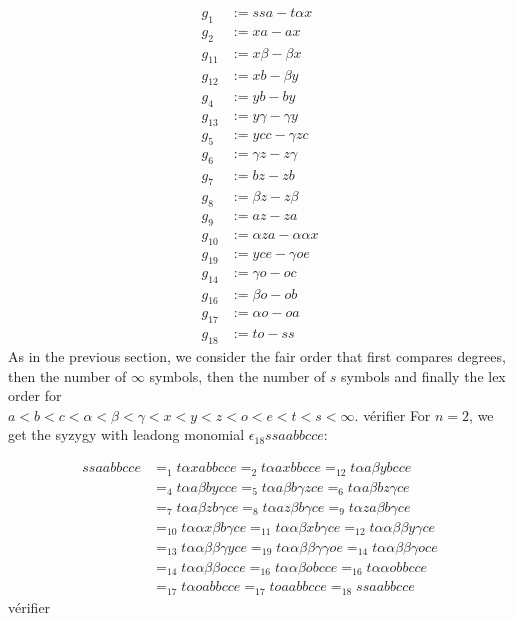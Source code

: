 \documentclass[sigconf]{acmart}
\theoremstyle{plain}
\theoremstyle{definition}
\theoremstyle{remark}
\newcommand\fixmecc[1]{{\color{red}{\underline{\bf C:}} #1}}
\begin{document}
\begin{align*}
g_1 & := ssa - t\alpha x \\ 
g_2 & := xa - ax \\ 
g_{11} & := x\beta-\beta x\\ 
g_{12} & := xb-\beta y \\ 
g_4 & := yb-by\\ 
g_{13} & := y\gamma-\gamma y \\
g_5 & := ycc-\gamma zc \\ 
g_6 & :=  \gamma z-z\gamma\\ 
g_7 & := bz-zb \\
g_8 & := \beta z-z\beta \\
g_9 & := az-za \\ 
g_{10} & := \alpha za-\alpha\alpha x  \\ 
g_{19} & := yce - \gamma oe \\
g_{14} & := \gamma o-oc \\
g_{16} & := \beta o-ob \\ 
g_{17} & := \alpha o-oa \\ 
g_{18} & := to-ss
\end{align*}
As in the previous section, we consider the fair order that first compares degrees, then the number of $\infty$ symbols, then the number of $s$ symbols and finally the lex order for\\
$a<b<c<\alpha<\beta<\gamma<x<y<z<o<e<t<s<\infty$. 
\fixmecc{vérifier}
For $n=2$, we get the syzygy with leadong monomial $\epsilon_{18}ssaabbcce$:

\begin{align*}
ssaabbcce & =_{1} t\alpha xabbcce =_{2} t\alpha axbbcce =_{12} t\alpha a\beta ybcce \\
& =_{4} t\alpha a\beta bycce =_{5} t\alpha a\beta b\gamma zce =_{6} t\alpha a\beta bz\gamma ce \\
& =_{7} t\alpha a\beta zb\gamma ce =_{8} t\alpha az\beta b\gamma ce =_{9} t\alpha za\beta b\gamma ce \\
& =_{10} t\alpha\alpha x\beta b\gamma ce =_{11} t\alpha\alpha\beta xb\gamma ce =_{12} t\alpha\alpha\beta\beta y\gamma ce \\
& =_{13} t\alpha\alpha\beta\beta\gamma yce =_{19} t\alpha\alpha\beta\beta\gamma\gamma oe =_{14}
t\alpha\alpha\beta\beta\gamma oce\\
& =_{14} t\alpha\alpha\beta\beta occe =_{16} t\alpha\alpha\beta obcce
=_{16} t\alpha\alpha obbcce\\ 
& =_{17}t\alpha oabbcce =_{17} toaabbcce =_{18}ssaabbcce
\end{align*}
\fixmecc{vérifier}
\end{document}
